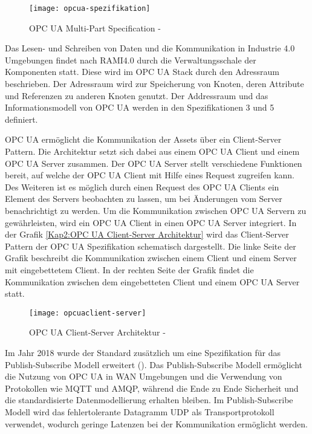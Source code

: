 \begin{figure}[h]
  \centering
  \texttt{[image: opcua-spezifikation]}
  \caption{OPC UA Multi-Part Specification - \cite{opcpt1}} 
  \label{Kap2:OPC UA Multi-Part Specification}
\end{figure}

\clearpage

Das Lesen- und Schreiben von Daten und die Kommunikation in Industrie 4.0 Umgebungen findet nach \ac{RAMI4.0} durch die Verwaltungsschale der Komponenten statt. Diese wird im \ac{OPC UA} Stack durch den Adressraum beschrieben. Der Adressraum wird zur Speicherung von Knoten, deren Attribute und Referenzen zu anderen Knoten genutzt. Der Addressraum und das Informationsmodell von \ac{OPC UA} werden in den Spezifikationen 3 \cite{opcpc3} und 5 \cite{opcpt5} definiert.

\ac{OPC UA} ermöglicht die Kommunikation der Assets über ein Client-Server Pattern. Die Architektur setzt sich dabei aus einem \ac{OPC UA} Client und einem \ac{OPC UA} Server zusammen. Der \ac{OPC UA} Server stellt verschiedene Funktionen bereit, auf welche der \ac{OPC UA} Client mit Hilfe eines Request zugreifen kann. Des Weiteren ist es möglich durch einen Request des \ac{OPC UA} Clients ein Element des Servers beobachten zu lassen, um bei Änderungen vom Server benachrichtigt zu werden. Um die Kommunikation zwischen \ac{OPC UA} Servern zu gewährleisten, wird ein \ac{OPC UA} Client in einen \ac{OPC UA} Server integriert. In der Grafik \autoref{Kap2:OPC UA Client-Server Architektur} wird das Client-Server Pattern der \ac{OPC UA} Spezifikation schematisch dargestellt. Die linke Seite der Grafik beschreibt die Kommunikation zwischen einem Client und einem Server mit eingebettetem Client. In der rechten Seite der Grafik findet die Kommunikation zwischen dem eingebetteten Client und einem \ac{OPC UA} Server statt.

\begin{figure}[h]
  \centering
  \texttt{[image: opcuaclient-server]}
  \caption{OPC UA Client-Server Architektur - \cite{opcpt1}} 
  \label{Kap2:OPC UA Client-Server Architektur}
\end{figure}

\clearpage

Im Jahr 2018 wurde der Standard zusätzlich um eine Spezifikation für das Publish-Subscribe Modell erweitert (\cite{hoppe2018}). Das Publish-Subscribe Modell ermöglicht die Nutzung von \ac{OPC UA} in \ac{WAN} Umgebungen und die Verwendung von Protokollen wie \ac{MQTT} und \ac{AMQP}, während die Ende zu Ende Sicherheit und die standardisierte Datenmodellierung erhalten bleiben. Im Publish-Subscribe Modell wird das fehlertolerante Datagramm \ac{UDP} als Transportprotokoll verwendet, wodurch geringe Latenzen bei der Kommunikation ermöglicht werden.

